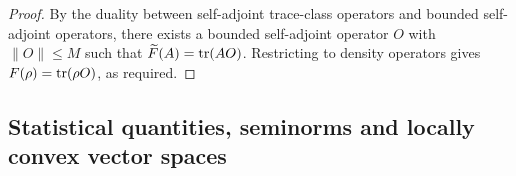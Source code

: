 \begin{mathSection}
\begin{proof}
	By the duality between self-adjoint trace-class operators and bounded self-adjoint operators, there exists a bounded self-adjoint operator $O$ with $\|O\| \leq M$ such that $\widetilde{F}(A)=\operatorname{tr}(AO)$. Restricting to density operators gives $F(\rho)=\operatorname{tr}(\rho O)$, as required.
\end{proof}
\end{mathSection}


\subsection{Statistical quantities, seminorms and locally convex vector spaces}





